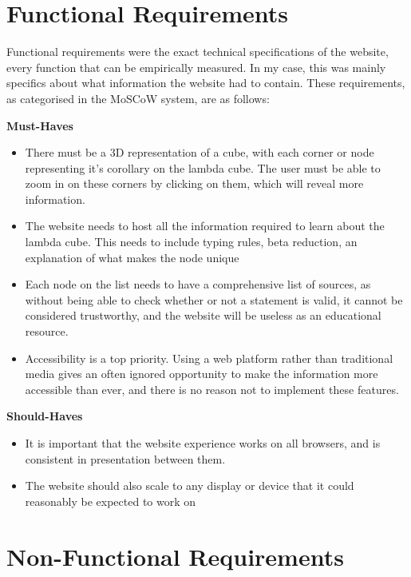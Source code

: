 \documentclass{l4proj}
\begin{document}
\section{Functional Requirements}

Functional requirements were the exact technical specifications of the website, every function that can be empirically measured.  In my case, this was mainly specifics about what information the website had to contain.  These requirements, as categorised in the MoSCoW system, are as follows:

\textbf{Must-Haves}

\begin{itemize}
    \item There must be a 3D representation of a cube, with each corner or node representing it's corollary on the lambda cube.  The user must be able to zoom in on these corners by clicking on them, which will reveal more information.

    \item The website needs to host all the information required to learn about the lambda cube.  This needs to include typing rules, beta reduction, an explanation of what makes the node unique

    \item Each node on the list needs to have a comprehensive list of sources, as without being able to check whether or not a statement is valid, it cannot be considered trustworthy, and the website will be useless as an educational resource.

    \item Accessibility is a top priority.  Using a web platform rather than traditional media gives an often ignored opportunity to make the information more accessible than ever, and there is no reason not to implement these features.
    
\end{itemize}

\textbf{Should-Haves}

\begin{itemize}
    \item It is important that the website experience works on all browsers, and is consistent in presentation between them. \item The website should also scale to any display or device that it could reasonably be expected to work on
\end{itemize}

\section{Non-Functional Requirements}
\end{document}
